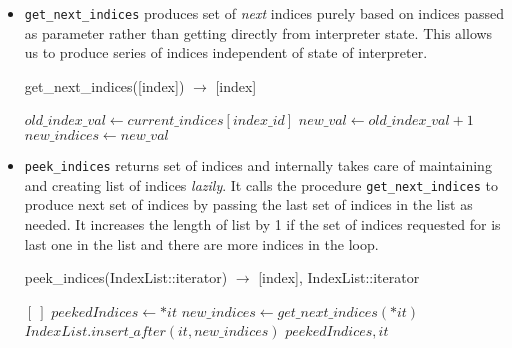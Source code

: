 \begin{itemize}
\item \texttt{get\_next\_indices} produces set of \textit{next} indices purely
  based on indices passed as parameter rather than getting directly from interpreter
  state. This allows us to produce series of indices independent of state of
  interpreter.
  \begin{algorithm}  {get\_next\_indices([index]) $\rightarrow$ [index]}
    \singlespacing

    \begin{algorithmic}[1]
      \State $old\_index\_val \gets current\_indices[index\_id]$
      \State $new\_val \gets old\_index\_val + 1$
      \State $new\_indices \gets new\_val$
      \EndFor%
      \State {}
      \EndFunction
    \end{algorithmic}
  \end{algorithm}

\item \texttt{peek\_indices} returns set of indices and internally takes care of
  maintaining and creating list of indices \textit{lazily}. It calls the procedure
  \texttt{get\_next\_indices} to produce next set of indices by passing the last
  set of indices in the list as needed. It increases the length of list by 1 if
  the set of indices requested for is last one in the list and there are more indices
  in the loop.

  \begin{algorithm}  {peek\_indices(IndexList::iterator) $\rightarrow$ [index], IndexList::iterator}
    \singlespacing

    \begin{algorithmic}[1]
      \State \Return $[\ ]$
      \Else
      \State $peekedIndices \gets *it$
      \State $new\_indices \gets get\_next\_indices(*it)$
      \State $IndexList.insert\_after(it, new\_indices)$
      \EndIf
      \State \Return $peekedIndices, it$
      \EndIf
      \EndFunction
    \end{algorithmic}
  \end{algorithm}


\end{itemize}
